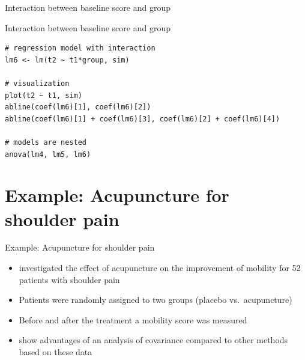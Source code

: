 \documentclass[aspectratio=169]{beamer}
\begin{document}
\begin{frame}{Interaction between baseline score and group}
\begin{center}
\end{center}
\end{frame}

\begin{frame}[fragile]{Interaction between baseline score and group}
\begin{lstlisting}
# regression model with interaction
lm6 <- lm(t2 ~ t1*group, sim)

# visualization
plot(t2 ~ t1, sim)
abline(coef(lm6)[1], coef(lm6)[2])
abline(coef(lm6)[1] + coef(lm6)[3], coef(lm6)[2] + coef(lm6)[4])

# models are nested
anova(lm4, lm5, lm6)
\end{lstlisting}
\end{frame}

\section[Example]{Example: Acupuncture for shoulder pain}

\begin{frame}{Example: Acupuncture for shoulder pain}
\begin{itemize}
  \item \citet{Kleinhenz1999} investigated the effect of acupuncture on
    the improvement of mobility for 52 patients with shoulder pain
  \item Patients were randomly assigned to two groups (placebo vs.\
    acupuncture)
  \item Before and after the treatment a mobility score was measured
  \item \citet{VickersAltman2001} show advantages of an analysis of
    covariance compared to other methods based on these data
\end{itemize}
\end{frame}
\end{document}
